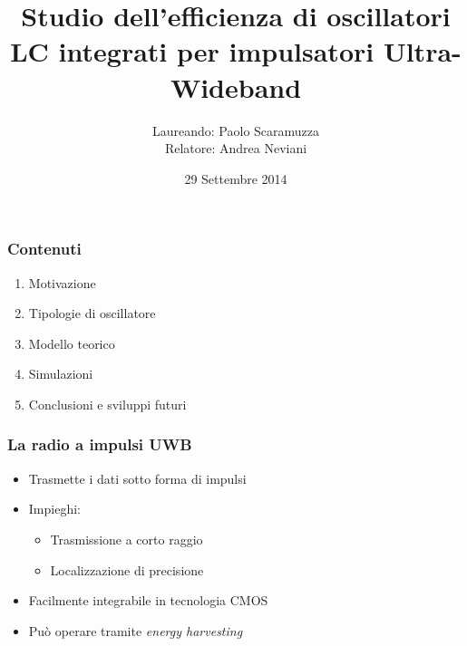 \documentclass{beamer}
\title{Studio dell'efficienza di oscillatori LC integrati per impulsatori
	Ultra-Wideband}
\author{Laureando: Paolo Scaramuzza \\ Relatore: Andrea Neviani}
\date{29 Settembre 2014}
\begin{document}
%
\begin{frame}
\maketitle
\end{frame}
%
\begin{frame}
\frametitle{Contenuti}
\begin{enumerate}
	\item Motivazione
	\vfill %
	\item Tipologie di oscillatore
	\vfill
	\item Modello teorico
	\vfill
	\item Simulazioni
	\vfill
	\item Conclusioni e sviluppi futuri
	\vfill
\end{enumerate}
\end{frame}
%
\begin{frame}
\frametitle{La radio a impulsi UWB}
\begin{itemize}
	\item Trasmette i dati sotto forma di impulsi
	\vfill
	\item Impieghi:
	\begin{itemize}
		\item Trasmissione a corto raggio
		\item Localizzazione di precisione
	\end{itemize}
	\vfill
	\item Facilmente integrabile in tecnologia CMOS
	\vfill
	\item Pu\`o operare tramite \emph{energy harvesting}
	\vfill
\end{itemize}
\end{frame}
%
\end{document}
